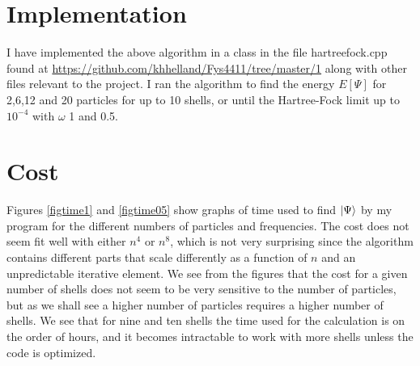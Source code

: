 \documentclass[a4paper,english,12pt]{article}
\newcommand{\bb}[1]{\boldsymbol{#1}}
\begin{document}




\section{Implementation}

I have implemented the above algorithm in a class in the file hartreefock.cpp found at \url{https://github.com/khhelland/Fys4411/tree/master/1} along with
other files relevant to the project. I ran the algorithm to find the energy $E[\Psi]$ for 2,6,12 and 20 particles for up to 10 shells, or
until the Hartree-Fock limit up to $10^{-4}$ with $\omega$ 1 and 0.5. 

\section{Cost}
Figures \ref{figtime1} and \ref{figtime05} show graphs of time used to find $\Ket{\Psi}$ by my program for the different numbers of particles
and frequencies. The cost does not seem fit well with either $n^4$ or $n^8$, which is not very surprising since the algorithm contains different
parts that scale differently as a function of $n$ and an unpredictable iterative element. We see from the figures that the cost for a given
number of shells does not seem to be very sensitive to the number of particles, but as we shall see a higher number of particles requires a
higher number of shells. We see that for nine and ten shells the time used for the calculation is on the order of hours, and it becomes intractable
to work with more shells unless the code is optimized.
\end{document}
